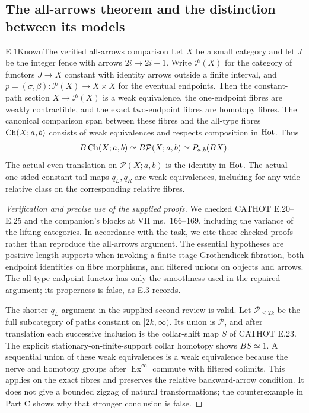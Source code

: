 \subsection{The all-arrows theorem and the distinction between its models}

\begin{result}{E.1}{Known}{The verified all-arrows comparison}
Let $X$ be a small category and let $J$ be the integer fence with arrows $2i\to2i\pm1$. Write $\mathcal P(X)$ for the category of functors $J\to X$ constant with identity arrows outside a finite interval, and $p=(\sigma,\beta):\mathcal P(X)\to X\times X$ for the eventual endpoints. Then the constant-path section $X\to\mathcal P(X)$ is a weak equivalence, the one-endpoint fibres are weakly contractible, and the exact two-endpoint fibres are homotopy fibres. The canonical comparison span between these fibres and the all-type fibres $\operatorname{Ch}(X;a,b)$ consists of weak equivalences and respects composition in $\mathrm{Hot}$. Thus
\[
 B\operatorname{Ch}(X;a,b)\simeq B\mathcal P(X;a,b)\simeq P_{a,b}(BX).
\]
The actual even translation on $\mathcal P(X;a,b)$ is the identity in $\mathrm{Hot}$. The actual one-sided constant-tail maps $q_L,q_R$ are weak equivalences, including for any wide relative class on the corresponding relative fibres.
\end{result}
\begin{proof}[Verification and precise use of the supplied proofs]
We checked CATHOT E.20--E.25 and the companion's blocks at VII ms.~166--169, including the variance of the lifting categories. In accordance with the task, we cite those checked proofs rather than reproduce the all-arrows argument. The essential hypotheses are positive-length supports when invoking a finite-stage Grothendieck fibration, both endpoint identities on fibre morphisms, and filtered unions on objects and arrows. The all-type endpoint functor has only the smoothness used in the repaired argument; its properness is false, as E.3 records.

The shorter $q_L$ argument in the supplied second review is valid. Let $\mathcal P_{\leq2k}$ be the full subcategory of paths constant on $[2k,\infty)$. Its union is $\mathcal P$, and after translation each successive inclusion is the collar-shift map $S$ of CATHOT E.23. The explicit stationary-on-finite-support collar homotopy shows $BS\simeq1$. A sequential union of these weak equivalences is a weak equivalence because the nerve and homotopy groups after $\operatorname{Ex}^{\infty}$ commute with filtered colimits. This applies on the exact fibres and preserves the relative backward-arrow condition. It does not give a bounded zigzag of natural transformations; the counterexample in Part C shows why that stronger conclusion is false.
\end{proof}

